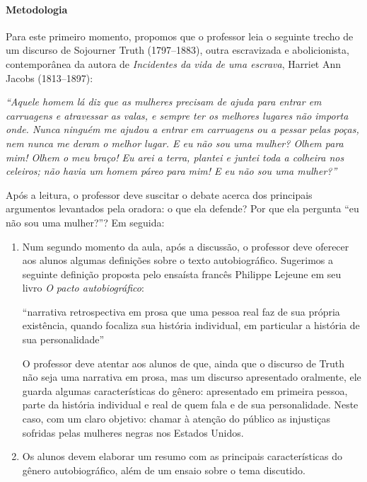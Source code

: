 \documentclass[11pt]{extarticle}
\begin{document}
\paragraph{Metodologia}

    Para este primeiro momento, propomos que o professor leia o seguinte trecho
    de um discurso de Sojourner Truth (1797--1883), outra escravizada e abolicionista, contemporânea
    da autora de \textit{Incidentes da vida de uma escrava}, Harriet Ann Jacobs (1813--1897):

    \textit{``Aquele homem lá diz que as mulheres precisam de ajuda para entrar em carruagens
    e atravessar as valas, e sempre ter os melhores lugares não importa onde. Nunca ninguém
    me ajudou a entrar em carruagens ou a pessar pelas poças, nem nunca me deram o melhor
    lugar. E eu não sou uma mulher? Olhem para mim! Olhem o meu braço! Eu arei a terra, 
    plantei e juntei toda a colheira nos celeiros; não havia um homem páreo para mim! 
    E eu não sou uma mulher?''}

    Após a leitura, o professor deve suscitar o debate acerca dos principais argumentos 
    levantados pela oradora: o que ela defende? Por que ela pergunta ``eu não sou uma mulher?''?
    Em seguida:




   \begin{enumerate}
    \item
    Num segundo momento da aula, após a discussão, o professor deve oferecer aos alunos algumas 
    definições sobre o texto autobiográfico. Sugerimos a seguinte definição
    proposta pelo ensaísta francês Philippe Lejeune em seu livro \emph{O pacto autobiográfico}:

    ``narrativa retrospectiva em prosa que uma pessoa real faz de sua própria existência, 
    quando focaliza sua história individual, em particular a história de sua personalidade'' 

    O professor deve atentar aos alunos de que, ainda que o discurso de Truth não seja uma 
    narrativa em prosa, mas um discurso apresentado oralmente, ele guarda algumas características
    do gênero: apresentado em primeira pessoa, parte da história individual e real de quem fala
    e de sua personalidade. Neste caso, com um claro objetivo: chamar à atenção do público
    as injustiças sofridas pelas mulheres negras nos Estados Unidos.

    \item
    Os alunos devem elaborar um resumo com as principais características do gênero autobiográfico,
    além de um ensaio sobre o tema discutido.


   \end{enumerate}
\end{document}
